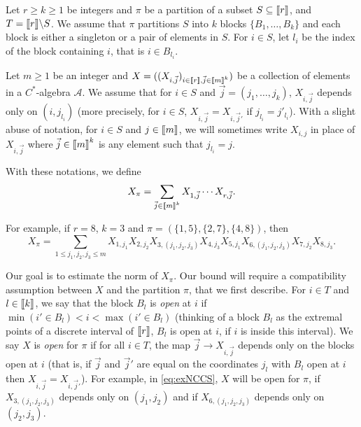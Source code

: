 \documentclass[11pt]{article}
\newcommand{\cA}{\mathcal{A}}
\newcommand{\1}{1\!\!{\sf I}}
\newcommand{\INT}[1]{{{\left[\hspace{-1.4pt}\left[#1\right]\hspace{-1.4pt}\right]}}}
\begin{document}
Let $r \geq k \geq 1$ be integers and $\pi$ be a partition of a subset $S \subseteq \INT{r}$, and $T = \INT{r} \backslash S$. We assume that $\pi$ partitions $S$ into $k$ blocks $\{B_1,\ldots,B_k\}$ and each block is either a singleton or a pair of elements in $S$. For $i \in S$, let $l_i$ be the index of the block containing $i$, that is $i \in B_{l		_i}$. 

Let $m\geq 1$ be an integer and $X= ( (X_{i,\vec j})_{i\in \INT{r},\vec j\in \INT{m}^k})$ be a collection of elements in a $C^*$-algebra $\cA$. We assume that for $i \in S$ and $\vec j = (j_1,\ldots,j_k)$, $X_{i,\vec j}$ depends only on $(i,j_{l_i})$ (more precisely, for $i \in S$, $X_{i,\vec j} = X_{i,\vec j'}$ if $j_{l_i} = j'_{l_i}$). With a slight abuse of notation, for $i \in S$ and $j \in \INT{m}$, we will sometimes write $X_{i,j}$ in place of $X_{i,\vec j}$ where $\vec j \in \INT{m}^k$ is any element such that $j_{l_i} = j$. 

With these notations, we define
$$
X_{\pi}=\sum_{\vec j  \in \INT{m}^k} X_{1,\vec j}\cdots X_{r,\vec j}.
$$

For example, if $r = 8$, $k=3$ and $\pi = (\{1,5\},\{2,7\},\{4,8\})$, then
\begin{equation}\label{eq:exNCCS}
X_{\pi} = \sum_{1 \leq j_1,j_2 ,j_3 \leq m} X_{1,j_1}  X_{2,j_2} X_{3,(j_1,j_2,j_3)} X_{4,j_3} X_{5,j_1}  X_{6,(j_1,j_2,j_3)}X_{7,j_2}   X_{8,j_3}. 
\end{equation}


Our goal is to estimate the norm of $X_{\pi}$. Our bound will require a compatibility assumption between $X$ and the partition $\pi$, that we first describe.  For $i \in T$ and $l \in \INT{k}$, we say that the block $B_l$ is {\em open} at $i$ if $\min (i' \in B_l) < i < \max (i' \in B_l)$ (thinking of a block $B_l$ as the extremal points of a discrete interval of $\INT{r}$, $B_l$ is open at $i$, if $i$ is inside this interval). We say $X$ is {\em open} for $\pi$ if for all $i \in T$, the map $\vec j  \to X_{i,\vec j}$ depends only on the blocks open at $i$ (that is, if $\vec j$ and $\vec j'$ are equal on the coordinates $j_l$ with $B_l$ open at $i$ then $X_{i,\vec j} = X_{i,\vec j'}$).  For example, in \eqref{eq:exNCCS}, $X$ will be open for $\pi$, if $X_{3,(j_1,j_2,j_3)}$ depends only on $(j_1,j_2)$ and if $ X_{6,(j_1,j_2,j_3)}$ depends only on $(j_2,j_3)$. 
\end{document}
